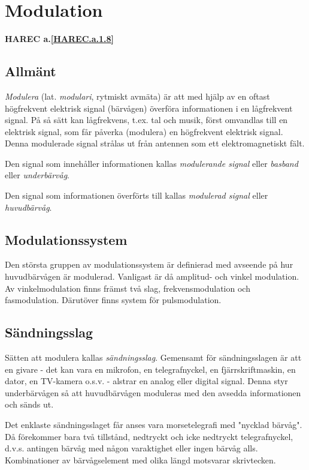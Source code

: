 \section{Modulation}
\textbf{HAREC a.\ref{HAREC.a.1.8}\label{myHAREC.a.1.8}}

\subsection{Allmänt}

\emph{Modulera} (lat. \emph{modulari}, rytmiskt avmäta) är att med hjälp av en
oftast högfrekvent elektrisk signal (bärvågen) överföra informationen i en
lågfrekvent signal. På så sätt kan lågfrekvens, t.ex. tal och musik, först
omvandlas till en elektrisk signal, som får påverka (modulera) en högfrekvent
elektrisk signal. Denna modulerade signal strålas ut från antennen som ett
elektromagnetiskt fält.

Den signal som innehåller informationen kallas \emph{modulerande signal} eller
\emph{basband} eller \emph{underbärvåg}.

Den signal som informationen överförts till kallas \emph{modulerad signal}
eller \emph{huvudbärvåg}.

\subsection{Modulationssystem}

Den största gruppen av modulationssystem är definierad med avseende på hur
huvudbärvågen är modulerad. Vanligast är då amplitud- och vinkel modulation.
Av vinkelmodulation finns främst två slag, frekvensmodulation och
fasmodulation. Därutöver finns system för pulsmodulation.

\subsection{Sändningsslag}

Sätten att modulera kallas \emph{sändningsslag}. Gemensamt för sändningsslagen
är att en givare - det kan vara en mikrofon, en telegrafnyckel, en
fjärrskriftmaskin, en dator, en TV-kamera o.s.v. - alstrar en analog eller
digital signal. Denna styr underbärvågen så att huvudbärvågen moduleras med den
avsedda informationen och sänds ut.

Det enklaste sändningsslaget får anses vara morsetelegrafi med "nycklad bärvåg".
Då förekommer bara två tillstånd, nedtryckt och icke nedtryckt telegrafnyckel,
d.v.s. antingen bärvåg med någon varaktighet eller ingen bärvåg alls.
Kombinationer av bärvågselement med olika längd motsvarar skrivtecken.

